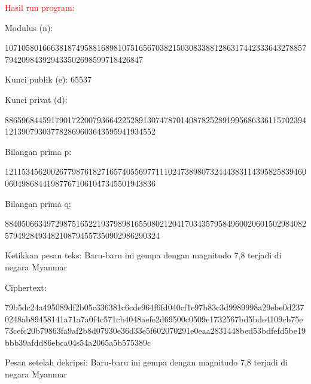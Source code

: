 \documentclass{article}
\begin{document}

\textcolor{red}{\huge Hasil run program:}

Modulus (n):

107105801666381874958816898107516567038215030833881286317442333643278857794209843929433502698599718426847

Kunci publik (e): 65537

Kunci privat (d):

886596844591790172200793664225289130747870140878252891995686336115702394121390793037782869603643595941934552

Bilangan prima p:

121153456200267798761827165740556977111024738980732444383114395825839460060498684419877671061047345501943836

Bilangan prima q:

8840506634972987516522193798981655080212041703435795849600206015029840825794928493482108794557350902986290324

Ketikkan pesan teks: Baru-baru ini gempa dengan magnitudo 7,8 terjadi di negara Myanmar

Ciphertext:

79b5dc24a495089df2b05c336381c6cde964f6fd040cf1e97b83c3d9989998a29ebe0d2370248ab89458141a71a7a0f4c571cb4048aefe2d6\n9500c0509e1732567bd5bde4109cb75e73cefc20b79863fa9af2b8d07930e36d33e5f602070291e0eaa2831448bed53bdfefd5be19bbb\nb39afdd86ebca04s54a2065a5b575389c

Pesan setelah dekripsi: Baru-baru ini gempa dengan magnitudo 7,8 terjadi di negara Myanmar
\end{document}
